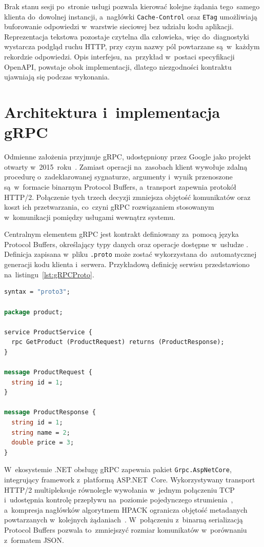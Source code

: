 Brak stanu sesji po~stronie usługi pozwala kierować kolejne żądania tego~samego klienta do~dowolnej instancji, a~nagłówki \texttt{Cache-Control} oraz \texttt{ETag} umożliwiają buforowanie odpowiedzi w~warstwie sieciowej bez udziału kodu aplikacji. Reprezentacja tekstowa pozostaje czytelna dla człowieka, więc do~diagnostyki wystarcza podgląd ruchu HTTP, przy czym nazwy pól powtarzane są~w~każdym rekordzie odpowiedzi. Opis interfejsu, na~przykład w~postaci specyfikacji OpenAPI, powstaje obok implementacji, dlatego niezgodności kontraktu ujawniają się podczas wykonania.


\section{Architektura i~implementacja gRPC}
\label{sec:gRPC}


Odmienne założenia przyjmuje gRPC, udostępniony przez Google jako projekt otwarty w~2015~roku~\cite{bib:gRPCDocs}. Zamiast operacji na~zasobach klient wywołuje zdalną procedurę o~zadeklarowanej sygnaturze, argumenty i~wynik przenoszone są~w~formacie binarnym Protocol Buffers, a~transport zapewnia protokół HTTP/2. Połączenie tych trzech decyzji zmniejsza objętość komunikatów oraz koszt ich przetwarzania, co~czyni gRPC rozwiązaniem stosowanym w~komunikacji pomiędzy usługami wewnątrz systemu.

Centralnym elementem gRPC jest kontrakt definiowany za~pomocą języka Protocol Buffers, określający typy danych oraz operacje dostępne w~usłudze \cite{bib:ProtocolBuffers}. Definicja zapisana w~pliku \texttt{.proto} może zostać wykorzystana do~automatycznej generacji kodu klienta i~serwera. Przykładową definicję serwisu przedstawiono na~listingu~\ref{lst:gRPCProto}.

\begin{lstlisting}[language=Protobuf, caption={Definicja serwisu gRPC w~formacie Protocol Buffers}, label=lst:gRPCProto]
syntax = "proto3";

package product;

service ProductService {
  rpc GetProduct (ProductRequest) returns (ProductResponse);
}

message ProductRequest {
  string id = 1;
}

message ProductResponse {
  string id = 1;
  string name = 2;
  double price = 3;
}
\end{lstlisting}

\begin{sloppypar}
W~ekosystemie .NET obsługę gRPC zapewnia pakiet \texttt{Grpc.AspNetCore}, integrujący framework z~platformą ASP.NET~Core. Wykorzystywany transport HTTP/2 multipleksuje równoległe wywołania w~jednym połączeniu TCP i~udostępnia kontrolę przepływu na~poziomie pojedynczego strumienia~\cite{bib:RFC9113}, a~kompresja nagłówków algorytmem HPACK ogranicza objętość metadanych powtarzanych w~kolejnych żądaniach~\cite{bib:RFC7541}. W~połączeniu z~binarną serializacją Protocol Buffers pozwala to~zmniejszyć rozmiar komunikatów w~porównaniu z~formatem JSON.
\end{sloppypar}
